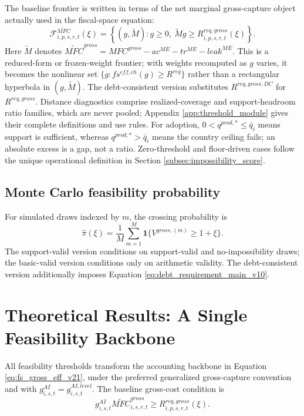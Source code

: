 \documentclass[11pt,a4paper]{article}
\begin{document}
The baseline frontier is written in terms of the net marginal gross-capture object actually used in the fiscal-space equation:
\begin{equation}\label{eq:frontier_main_v10}
    \mathcal{F}^{\widetilde{MFC}}_{i,p,s,r,t}(\xi)=
    \left\{(g,\widetilde M):g\geq0,\ \widetilde M g\geq R^{req,gross}_{i,p,s,r,t}(\xi)\right\}.
\end{equation}
Here $\widetilde M$ denotes $\widetilde{MFC}^{gross}=MFC^{gross}-ac^{ME}-tr^{ME}-leak^{ME}$. This is a reduced-form or frozen-weight frontier; with weights recomputed as $g$ varies, it becomes the nonlinear set $\{g:fs^{eff,ch}(g)\geq R^{req}\}$ rather than a rectangular hyperbola in $(g,\widetilde M)$. The debt-consistent version substitutes $R^{req,gross,DC}$ for $R^{req,gross}$. Distance diagnostics comprise realized-coverage and support-headroom ratio families, which are never pooled; Appendix \ref{app:threshold_module} gives their complete definitions and use rules.
For adoption, $0<q^{prod,*}\leq\bar q_i$ means support is sufficient, whereas $q^{prod,*}>\bar q_i$ means the country ceiling fails; an absolute excess is a gap, not a ratio. Zero-threshold and floor-driven cases follow the unique operational definition in Section \ref{subsec:impossibility_score}.

\subsection{Monte Carlo feasibility probability}

For simulated draws indexed by $m$, the crossing probability is
\begin{equation}\label{eq:mc_prob_main_v10}
    \widehat{\pi}(\xi)=\frac{1}{M}\sum_{m=1}^{M}\mathbf{1}\{V^{gross,(m)}\geq1+\xi\}.
\end{equation}
The support-valid version conditions on support-valid and no-impossibility draws; the basic-valid version conditions only on arithmetic validity. The debt-consistent version additionally imposes Equation \eqref{eq:debt_requirement_main_v10}.


\section{Theoretical Results: A Single Feasibility Backbone}\label{sec:theory}

All feasibility thresholds transform the accounting backbone in Equation \eqref{eq:fs_gross_eff_v21}, under the preferred generalized gross-capture convention and with $g^{AI}_{i,s,t}=g^{AI,level}_{i,s,t}$. The baseline gross-cost condition is
\begin{equation}\label{eq:backbone_inequality_v17}
    g^{AI}_{i,s,t}\widetilde{MFC}^{gross}_{i,s,r,t}\geq R^{req,gross}_{i,p,s,r,t}(\xi).
\end{equation}
\end{document}

